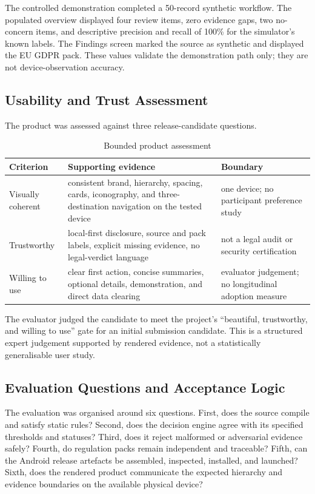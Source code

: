 The controlled demonstration completed a 50-record synthetic workflow. The populated overview displayed four review items, zero evidence gaps, two no-concern items, and descriptive precision and recall of 100\% for the simulator's known labels. The Findings screen marked the source as synthetic and displayed the EU GDPR pack. These values validate the demonstration path only; they are not device-observation accuracy.

\subsection{Usability and Trust Assessment}

The product was assessed against three release-candidate questions.

\begin{table}[H]
\centering
\small
\caption{Bounded product assessment}
\begin{tabular}{>{\raggedright\arraybackslash}p{}>{\raggedright\arraybackslash}p{}>{\raggedright\arraybackslash}p{}}
\toprule
Criterion & Supporting evidence & Boundary \\
\midrule
Visually coherent & consistent brand, hierarchy, spacing, cards, iconography, and three-destination navigation on the tested device & one device; no participant preference study \\
Trustworthy & local-first disclosure, source and pack labels, explicit missing evidence, no legal-verdict language & not a legal audit or security certification \\
Willing to use & clear first action, concise summaries, optional details, demonstration, and direct data clearing & evaluator judgement; no longitudinal adoption measure \\
\bottomrule
\end{tabular}
\end{table}

The evaluator judged the candidate to meet the project's ``beautiful, trustworthy, and willing to use'' gate for an initial submission candidate. This is a structured expert judgement supported by rendered evidence, not a statistically generalisable user study.

\subsection{Evaluation Questions and Acceptance Logic}

The evaluation was organised around six questions. First, does the source compile and satisfy static rules? Second, does the decision engine agree with its specified thresholds and statuses? Third, does it reject malformed or adversarial evidence safely? Fourth, do regulation packs remain independent and traceable? Fifth, can the Android release artefacts be assembled, inspected, installed, and launched? Sixth, does the rendered product communicate the expected hierarchy and evidence boundaries on the available physical device?

